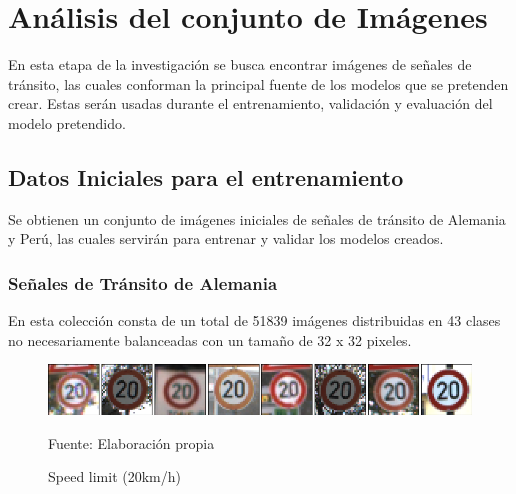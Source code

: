 \section{Análisis del conjunto de Imágenes}
	
	En esta etapa de la investigación se busca encontrar imágenes de señales de tránsito, las cuales conforman la principal fuente de los modelos que se pretenden crear. Estas serán usadas durante el entrenamiento, validación y evaluación del modelo pretendido.
	
	\subsection{Datos Iniciales para el entrenamiento}
		Se obtienen un conjunto de imágenes iniciales de señales de tránsito de Alemania y Perú, las cuales servirán para entrenar y validar los modelos creados.
		\subsubsection{Señales de Tránsito de Alemania}

			En esta colección consta de un total de 51839 imágenes distribuidas en 43 clases no necesariamente balanceadas con un tamaño de 32 x 32 pixeles.

			\begin{figure}[H]
				\begin{center}
				\includegraphics[width=1\textwidth]{images/desarrollo/imagenes/alemania/1__(1).png}
				\end{center}
				\begin{center}
				\caption{\small{Speed limit (20km/h)}}
				\vskip -0.25cm
				{\small{Fuente: Elaboración propia}}
				\end{center}
				\vspace{-1.5em}
			\end{figure}


